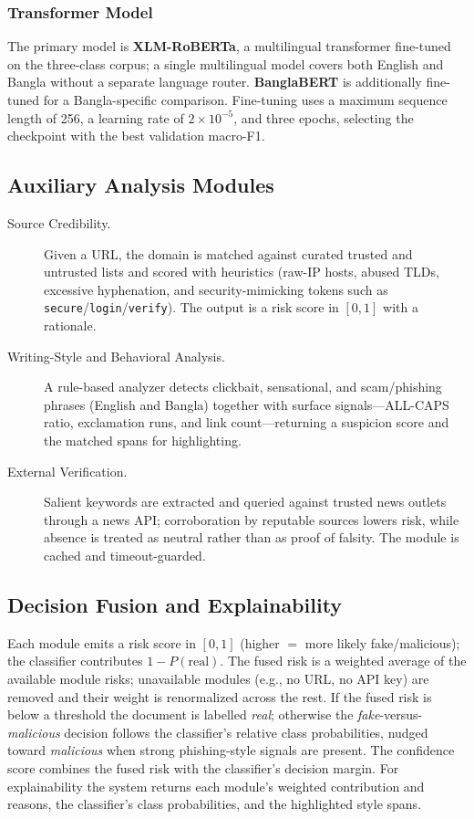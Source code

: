 \subsubsection{Transformer Model}
\label{sec:transformer}
The primary model is \textbf{XLM-RoBERTa}, a multilingual transformer fine-tuned
on the three-class corpus; a single multilingual model covers both English and
Bangla without a separate language router. \textbf{BanglaBERT} is additionally
fine-tuned for a Bangla-specific comparison. Fine-tuning uses a maximum sequence
length of 256, a learning rate of $2\times10^{-5}$, and three epochs, selecting
the checkpoint with the best validation macro-F1.

\subsection{Auxiliary Analysis Modules}
\begin{description}
  \item[Source Credibility.] Given a URL, the domain is matched against curated
        trusted and untrusted lists and scored with heuristics (raw-IP hosts,
        abused TLDs, excessive hyphenation, and security-mimicking tokens such as
        \texttt{secure}/\texttt{login}/\texttt{verify}). The output is a risk
        score in $[0,1]$ with a rationale.
  \item[Writing-Style and Behavioral Analysis.] A rule-based analyzer detects
        clickbait, sensational, and scam/phishing phrases (English and Bangla)
        together with surface signals---ALL-CAPS ratio, exclamation runs, and
        link count---returning a suspicion score and the matched spans for
        highlighting.
  \item[External Verification.] Salient keywords are extracted and queried
        against trusted news outlets through a news API; corroboration by
        reputable sources lowers risk, while absence is treated as neutral rather
        than as proof of falsity. The module is cached and timeout-guarded.
\end{description}

\subsection{Decision Fusion and Explainability}
\label{sec:fusion}
Each module emits a risk score in $[0,1]$ (higher $=$ more likely
fake/malicious); the classifier contributes $1-P(\text{real})$. The fused risk is
a weighted average of the available module risks; unavailable modules (e.g., no
URL, no API key) are removed and their weight is renormalized across the rest. If
the fused risk is below a threshold the document is labelled \emph{real};
otherwise the \emph{fake}-versus-\emph{malicious} decision follows the
classifier's relative class probabilities, nudged toward \emph{malicious} when
strong phishing-style signals are present. The confidence score combines the
fused risk with the classifier's decision margin. For explainability the system
returns each module's weighted contribution and reasons, the classifier's class
probabilities, and the highlighted style spans.

